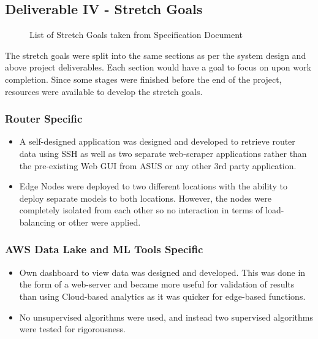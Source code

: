 \subsection {Deliverable IV - Stretch Goals}
\begin{figure}[ht]
    \centering
    \caption{List of Stretch Goals taken from Specification Document}
    \label{fig:stretch_goals_spec}
\end{figure}
The stretch goals were split into the same sections as per the system design and above project deliverables. Each section would have a goal to focus on upon work completion. Since some stages were finished before the end of the project, resources were available to develop the stretch goals. 

\subsubsection{Router Specific}
\begin{itemize}
    \item A self-designed application was designed and developed to retrieve router data using SSH as well as two separate web-scraper applications rather than the pre-existing Web GUI from ASUS or any other 3rd party application.
    \item Edge Nodes were deployed to two different locations with the ability to deploy separate models to both locations. However, the nodes were completely isolated from each other so no interaction in terms of load-balancing or other were applied.
\end{itemize}

\subsubsection{AWS Data Lake and ML Tools Specific}
\begin{itemize}
    \item Own dashboard to view data was designed and developed. This was done in the form of a web-server and became more useful for validation of results than using Cloud-based analytics as it was quicker for edge-based functions.
    \item No unsupervised algorithms were used, and instead two supervised algorithms were tested for rigorousness.
\end{itemize}

